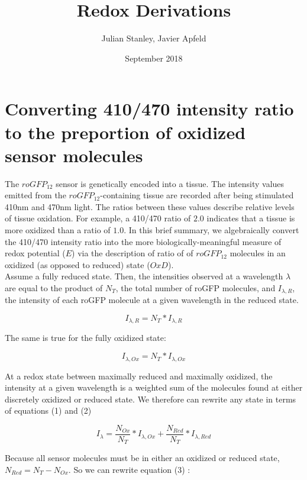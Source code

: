 \documentclass{article}
\title{Redox Derivations}
\author{Julian Stanley, Javier Apfeld}
\date{September 2018}
\begin{document}
\maketitle

\section{Converting 410/470 intensity ratio to the preportion of oxidized sensor molecules}
The $roGFP_{12}$ sensor is genetically encoded into a tissue. The intensity values emitted from the $roGFP_{12}$-containing tissue are recorded after being stimulated 410nm and 470nm light. The ratios between these values describe relative levels of tissue oxidation. For example, a 410/470 ratio of $2.0$ indicates that a tissue is more oxidized than a ratio of $1.0$. In this brief summary, we algebraically convert the 410/470 intensity ratio into the more biologically-meaningful measure of redox potential ($E$) via the description of ratio of of $roGFP_{12}$ molecules in an oxidized (as opposed to reduced) state ($OxD$). \\

Assume a fully reduced state. Then, the intensities observed at a wavelength $\lambda$ are equal to the product of $N_T$, the total number of roGFP molecules, and $I_{\lambda, R}$, the intensity of each roGFP molecule at a given wavelength in the  reduced state.

\begin{equation}
I_{\lambda, R} = N_T * I_{\lambda, R}
\end{equation}

The same is true for the fully oxidized state:

\begin{equation}
I_{\lambda, Ox} = N_T * I_{\lambda, Ox}
\end{equation}


At a redox state between maximally reduced and maximally oxidized, the intensity at a given wavelength is a weighted sum of the molecules found at either discretely oxidized or reduced state. We therefore can rewrite any state in terms of equations (1) and (2)

\begin{equation}
I_{\lambda} = \frac{N_{Ox}}{N_T} * I_{\lambda, Ox} +  \frac{N_{Red}}{N_T} * I_{\lambda, Red}
\end{equation}

Because all sensor molecules must be in either an oxidized or reduced state, $N_{Red} = N_T - N_{Ox}$. So we can rewrite equation (3) :
\end{document}
